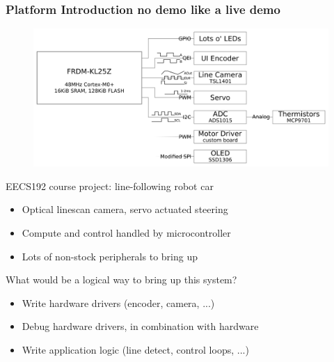\documentclass{beamer}
\begin{document}
\begin{frame}
\frametitle{Platform Introduction \small{no demo like a live demo}}
\begin{figure}
  \centering
  \def\svgwidth{\columnwidth}
  \tiny \includegraphics[width = 0.8\columnwidth]{images/192-block-diagram}
\end{figure}

 {
EECS192 course project: line-following robot car
\begin{itemize}
  \item Optical linescan camera, servo actuated steering
  \item Compute and control handled by microcontroller
  \item Lots of non-stock peripherals to bring up
\end{itemize}
}
 {
What would be a logical way to bring up this system?
 {
\begin{itemize}
  \item Write hardware drivers (encoder, camera, ...)
  \item Debug hardware drivers, in combination with hardware
  \item Write application logic (line detect, control loops, ...)
\end{itemize}
}
}
\end{frame}

\end{document}
